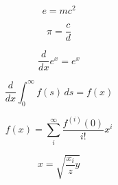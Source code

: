 \documentclass{article}
\begin{document}
\begin{equation}
e = mc^2
\end{equation}

\begin{equation}
\pi = \frac{c}{d}
\end{equation}

\begin{equation}
\frac{d}{dx}e^x = e^x
\end{equation}

\begin{equation}
\frac{d}{dx}\int_0^\infty f(s)\,ds = f(x)
\end{equation}

\begin{equation}
f(x) = \sum_i^\infty \frac{f^{(i)}(0)}{i!}x^i
\end{equation}

\begin{equation}
x = \sqrt{\frac{x_i}{z}y}
\end{equation}
\end{document}
